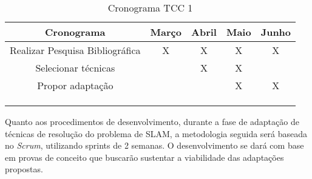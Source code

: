 \begin{table}[http]
	\centering
	\caption{Cronograma TCC 1}
	\label{tab:cronograma}
	\begin{tabular}{ccccc}
		\hline
		\multicolumn{1}{|c|}{\textbf{Cronograma}}             & \multicolumn{1}{c|}{\textbf{Março}} & \multicolumn{1}{c|}{\textbf{Abril}} & \multicolumn{1}{c|}{\textbf{Maio}} & \multicolumn{1}{c|}{\textbf{Junho}} \\ \hline
		\multicolumn{1}{|c|}{Realizar Pesquisa Bibliográfica} & \multicolumn{1}{c|}{X}              & \multicolumn{1}{c|}{X}              & \multicolumn{1}{c|}{X}             & \multicolumn{1}{c|}{X}              \\ \hline
		\multicolumn{1}{|c|}{Selecionar técnicas}             & \multicolumn{1}{c|}{}               & \multicolumn{1}{c|}{X}              & \multicolumn{1}{c|}{X}             & \multicolumn{1}{c|}{}               \\ \hline
		\multicolumn{1}{|c|}{Propor adaptação}                & \multicolumn{1}{c|}{}               & \multicolumn{1}{c|}{}               & \multicolumn{1}{c|}{X}             & \multicolumn{1}{c|}{X}              \\ \hline
		\multicolumn{1}{l}{}                                  & \multicolumn{1}{l}{}                & \multicolumn{1}{l}{}                & \multicolumn{1}{l}{}               & \multicolumn{1}{l}{}                \\
		\multicolumn{1}{l}{}                                  & \multicolumn{1}{l}{}                & \multicolumn{1}{l}{}                & \multicolumn{1}{l}{}               & \multicolumn{1}{l}{}                \\
		\multicolumn{1}{l}{}                                  & \multicolumn{1}{l}{}                & \multicolumn{1}{l}{}                & \multicolumn{1}{l}{}               & \multicolumn{1}{l}{}               
	\end{tabular}
\end{table}

Quanto aos procedimentos de desenvolvimento, durante a fase de adaptação de técnicas de resolução do problema de SLAM, a metodologia seguida será baseada no \textit{Scrum}, utilizando sprints de 2 semanas. O desenvolvimento se dará com base em provas de conceito que buscarão sustentar a viabilidade das adaptações propostas.
